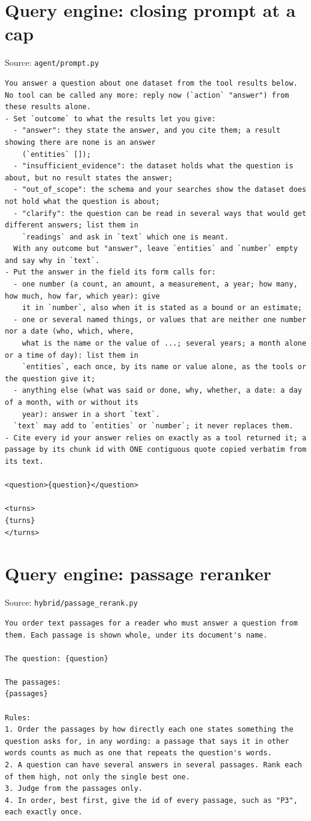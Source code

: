 \section*{Query engine: closing prompt at a cap}
\noindent Source: \texttt{agent/prompt.py}
\begin{lstlisting}
You answer a question about one dataset from the tool results below. No tool can be called any more: reply now (`action` "answer") from these results alone.
- Set `outcome` to what the results let you give:
  - "answer": they state the answer, and you cite them; a result showing there are none is an answer
    (`entities` []);
  - "insufficient_evidence": the dataset holds what the question is about, but no result states the answer;
  - "out_of_scope": the schema and your searches show the dataset does not hold what the question is about;
  - "clarify": the question can be read in several ways that would get different answers; list them in
    `readings` and ask in `text` which one is meant.
  With any outcome but "answer", leave `entities` and `number` empty and say why in `text`.
- Put the answer in the field its form calls for:
  - one number (a count, an amount, a measurement, a year; how many, how much, how far, which year): give
    it in `number`, also when it is stated as a bound or an estimate;
  - one or several named things, or values that are neither one number nor a date (who, which, where,
    what is the name or the value of ...; several years; a month alone or a time of day): list them in
    `entities`, each once, by its name or value alone, as the tools or the question give it;
  - anything else (what was said or done, why, whether, a date: a day of a month, with or without its
    year): answer in a short `text`.
  `text` may add to `entities` or `number`; it never replaces them.
- Cite every id your answer relies on exactly as a tool returned it; a passage by its chunk id with ONE contiguous quote copied verbatim from its text.

<question>{question}</question>

<turns>
{turns}
</turns>
\end{lstlisting}

\section*{Query engine: passage reranker}
\noindent Source: \texttt{hybrid/passage\_rerank.py}
\begin{lstlisting}
You order text passages for a reader who must answer a question from them. Each passage is shown whole, under its document's name.

The question: {question}

The passages:
{passages}

Rules:
1. Order the passages by how directly each one states something the question asks for, in any wording: a passage that says it in other words counts as much as one that repeats the question's words.
2. A question can have several answers in several passages. Rank each of them high, not only the single best one.
3. Judge from the passages only.
4. In order, best first, give the id of every passage, such as "P3", each exactly once.
\end{lstlisting}
